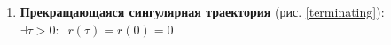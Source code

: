 \documentclass[12pt]{article}
\numberwithin{equation}{section}
\begin{document}
\begin{enumerate}
	\item \textbf{Прекращающаяся сингулярная траектория} (рис. \ref{terminating}):\\ $ \exists\tau>0: \;\; r(\tau)=r(0)=0 $ 
	\begin{figure}[h]
\end{figure}
\end{enumerate}
\end{document}

